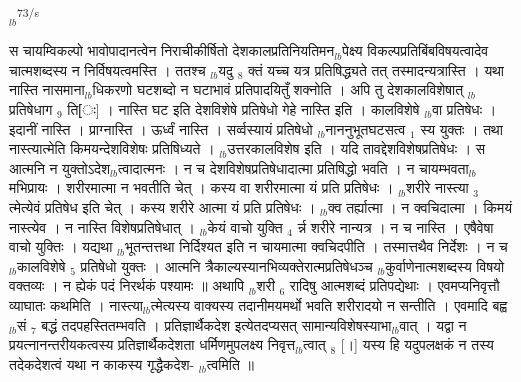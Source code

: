 \documentclass[article,12pt,a4paper]{memoir}%
\newcounter{parCount}
\begin{document}
	  
	  
	  \endgroup
	{\tiny $_{lb}$}\textsuperscript{\textenglish{73/s}}

	  
	  \pstart \leavevmode%
	स चायम्विकल्पो भावोपादानत्वेन निराचीकीर्षितो देशकालप्रतिनियतिमन{\tiny $_{lb}$}पेक्ष्य विकल्पप्रतिबिंबविषयत्वादेव चात्मशब्दस्य न निर्विषयत्वमस्ति । ततश्च {\tiny $_{lb}$}यदु {\tiny $_{8}$} क्तं यच्च यत्र प्रतिषिद्ध्यते तत् तस्मादन्यत्रास्ति । यथा नास्ति नासमाना{\tiny $_{lb}$}धिकरणो घटशब्दो न घटाभावं प्रतिपादयितुँ शक्नोति । अपि तु देशकालविशेषात् {\tiny $_{lb}$}प्रतिषेधाग {\tiny $_{9}$} \leavevmode{} ति[ः] । नास्ति घट इति देशविशेषे प्रतिषेधो गेहे नास्ति इति । कालविशेषे {\tiny $_{lb}$}वा प्रतिषेधः । इदानीं नास्ति । प्राग्नास्ति । ऊर्ध्वं नास्ति । सर्व्वस्यायं प्रतिषेधो {\tiny $_{lb}$}नाननुभूतघटसत्व {\tiny $_{1}$} स्य युक्तः । तथा नास्त्यात्मेति किमयन्देशविशेषः प्रतिषिध्यते । {\tiny $_{lb}$}उत्तरकालविशेष इति । यदि तावद्देशविशेषप्रतिषेधः । स आत्मनि न युक्तोऽदेश{\tiny $_{lb}$}त्वादात्मनः । न च देशविशेषप्रतिषेधादात्मा प्रतिषिद्धो भवति । न चायम्भवता{\tiny $_{lb}$}मभिप्रायः । शरीरमात्मा न भवतीति चेत् । कस्य वा शरीरमात्मा यं प्रति प्रतिषेधः । {\tiny $_{lb}$}शरीरे नास्त्या {\tiny $_{3}$} त्मेत्येवं प्रतिषेध इति चेत् । कस्य शरीरे आत्मा यं प्रति प्रतिषेधः । {\tiny $_{lb}$}क्व तर्ह्यात्मा । न क्वचिदात्मा । किमयं नास्त्येव । न नास्ति विशेषप्रतिषेधात् । {\tiny $_{lb}$}केयं वाचो युक्ति {\tiny $_{4}$} र्न्न शरीरे नान्यत्र । न च नास्ति । एषैवेषा वाचो युक्तिः । यद्यथा {\tiny $_{lb}$}भूतन्तत्तथा निर्दिश्यत इति न चायमात्मा क्वचिदपीति । तस्मात्तथैव निर्देशः । न च {\tiny $_{lb}$}कालविशेषे {\tiny $_{5}$} प्रतिषेधो युक्तः । आत्मनि त्रैकाल्यस्यानभिव्यक्तेरात्मप्रतिषेधञ्च {\tiny $_{lb}$}कुर्वाणेनात्मशब्दस्य विषयो वक्तव्यः । न ह्येकं पदं निरर्थकं पश्यामः ॥ अथापि {\tiny $_{lb}$}शरी {\tiny $_{6}$} रादिषु आत्मशब्दं प्रतिपद्येथाः । एवमप्यनिवृत्तौ व्याघातः कथमिति । नास्त्या{\tiny $_{lb}$}त्मेत्यस्य वाक्यस्य तदानीमयमर्थो भवति शरीरादयो न सन्तीति । एवमादि बह्व{\tiny $_{lb}$}सं {\tiny $_{7}$} बद्धं तदपहस्तितम्भवति । प्रतिज्ञार्थैकदेश इत्येतदप्यसत् सामान्यविशेषस्याभा{\tiny $_{lb}$}वात् । यद्वा न प्रयत्नानन्तरीयकत्वस्य प्रतिज्ञार्थैकदेशता धर्मिणमुपलक्ष्य निवृत्त{\tiny $_{lb}$}त्वात् {\tiny $_{8}$} \leavevmode{} [।] यस्य हि यदुपलक्षकं न तस्य तदेकदेशत्वं यथा न काकस्य गृद्धैकदेश- {\tiny $_{lb}$}त्वमिति ॥
	{}
	\pend%
      
\end{document}
